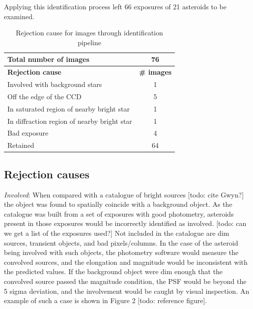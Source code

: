 \documentclass[iop,apj]{emulateapj}
\begin{document}

Applying this identification process left 66 exposures of 21 asteroids to be examined.

\begin{table}[htdp]
\caption{Rejection cause for images through identification pipeline}
\begin{center}
\begin{tabular}{lc}
	Total number of images							&	76 			\\
	\hline
	\textbf{Rejection cause}						& 	\textbf{\# images} \\
	\hline
	Involved with background stars                          & 	1			\\
	Off the edge of the CCD						& 	5			\\
	In saturated region of nearby bright star			& 	1			\\
	In diffraction region of nearby bright star		&	1			\\
	Bad exposure									& 	4			\\
	\hline
	Retained										&	64
\end{tabular}
\end{center}
\label{default}
\end{table}

\subsection{Rejection causes}

\textit{Involved}:
When compared with a catalogue of bright sources [todo: cite Gwyn?] the object was found to spatially coincide with a background object. As the catalogue was built from a set of exposures with good photometry, asteroids present in those exposures would be incorrectly identified as involved. [todo: can we get a list of the exposures used?] Not included in the catalogue are dim sources, transient objects, and bad pixels/columns. In the case of the asteroid being involved with such objects, the photometry software would measure the convolved sources, and the elongation and magnitude would be inconsistent with the predicted values. If the background object were dim enough that the convolved source passed the magnitude condition, the PSF would be beyond the 5 sigma deviation, and the involvement would be caught by visual inspection. An example of such a case is shown in Figure 2 [todo: reference figure].
\end{document}
